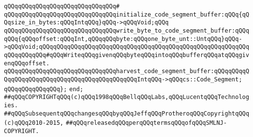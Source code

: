 \verb|qQQqqQQqqQQqqQQqqQQqqQQqqQQqqQQq#|\newline
\verb|qQQqqQQqqQQqqQQqqQQqqQQqqQQqqQQqinitialize_code_segment_buffer:qQQq{qQQqsize_in_bytes:qQQqIntqQQq}qQQq->qQQqVoid;qQQq|\newline
\newline
\verb|qQQqqQQqqQQqqQQqqQQqqQQqqQQqqQQqwrite_byte_to_code_segment_buffer:qQQqqQQq{qQQqoffset:qQQqInt,qQQqqQQqbyte:qQQqone_byte_unt::UntqQQq}qQQq->qQQqVoid;qQQqqQQqqQQqqQQqqQQqqQQqqQQqqQQqqQQqqQQqqQQqqQQqqQQqqQQqqQQqqQQqqQQqqQQq#qQQqWriteqQQqgivenqQQqbyteqQQqintoqQQqbufferqQQqatqQQqgivenqQQqoffset.|\newline
\newline
\verb|qQQqqQQqqQQqqQQqqQQqqQQqqQQqqQQqharvest_code_segment_buffer:qQQqqQQqqQQqqQQqqQQqqQQqqQQqqQQqqQQqqQQqqQQqqQQqIntqQQq->qQQqcs::Code_Segment;|\newline
\verb|qQQqqQQqqQQqqQQq};|\newline
\verb|end;|\newline
\newline
\newline
\verb|##qQQqCOPYRIGHTqQQq(c)qQQq1998qQQqBellqQQqLabs,qQQqLucentqQQqTechnologies.|\newline
\verb|##qQQqSubsequentqQQqchangesqQQqbyqQQqJeffqQQqProtheroqQQqCopyrightqQQq(c)qQQq2010-2015,|\newline
\verb|##qQQqreleasedqQQqperqQQqtermsqQQqofqQQqSMLNJ-COPYRIGHT.|\newline

